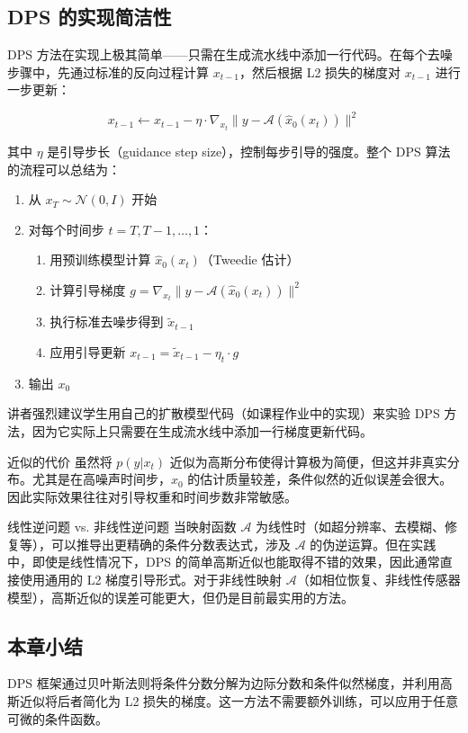 \subsection{DPS 的实现简洁性}

DPS 方法在实现上极其简单——只需在生成流水线中添加一行代码。在每个去噪步骤中，先通过标准的反向过程计算 $x_{t-1}$，然后根据 L2 损失的梯度对 $x_{t-1}$ 进行一步更新：

$$x_{t-1} \leftarrow x_{t-1} - \eta \cdot \nabla_{x_t} \| y - \mathcal{A}(\hat{x}_0(x_t)) \|^2$$

其中 $\eta$ 是引导步长（guidance step size），控制每步引导的强度。整个 DPS 算法的流程可以总结为：

\begin{enumerate}
    \item 从 $x_T \sim \mathcal{N}(0, I)$ 开始
    \item 对每个时间步 $t = T, T-1, \ldots, 1$：
    \begin{enumerate}
        \item 用预训练模型计算 $\hat{x}_0(x_t)$（Tweedie 估计）
        \item 计算引导梯度 $g = \nabla_{x_t} \| y - \mathcal{A}(\hat{x}_0(x_t)) \|^2$
        \item 执行标准去噪步得到 $\tilde{x}_{t-1}$
        \item 应用引导更新 $x_{t-1} = \tilde{x}_{t-1} - \eta_t \cdot g$
    \end{enumerate}
    \item 输出 $x_0$
\end{enumerate}

讲者强烈建议学生用自己的扩散模型代码（如课程作业中的实现）来实验 DPS 方法，因为它实际上只需要在生成流水线中添加一行梯度更新代码。

\begin{warningbox}{近似的代价}
虽然将 $p(y|x_t)$ 近似为高斯分布使得计算极为简便，但这并非真实分布。尤其是在高噪声时间步，$\hat{x}_0$ 的估计质量较差，条件似然的近似误差会很大。因此实际效果往往对引导权重和时间步数非常敏感。
\end{warningbox}

\begin{knowledgebox}{线性逆问题 vs. 非线性逆问题}
当映射函数 $\mathcal{A}$ 为线性时（如超分辨率、去模糊、修复等），可以推导出更精确的条件分数表达式，涉及 $\mathcal{A}$ 的伪逆运算。但在实践中，即使是线性情况下，DPS 的简单高斯近似也能取得不错的效果，因此通常直接使用通用的 L2 梯度引导形式。对于非线性映射 $\mathcal{A}$（如相位恢复、非线性传感器模型），高斯近似的误差可能更大，但仍是目前最实用的方法。
\end{knowledgebox}

\subsection{本章小结}

DPS 框架通过贝叶斯法则将条件分数分解为边际分数和条件似然梯度，并利用高斯近似将后者简化为 L2 损失的梯度。这一方法不需要额外训练，可以应用于任意可微的条件函数。

